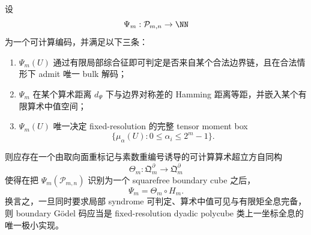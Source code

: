 \begin{conjecture}\label{conj:conclusion-boundary-godel-single-coordinate-holography-uniqueness}
设
\[
\Psi_m:\mathcal P_{m,n}\to \NN
\]
为一个可计算编码，并满足以下三条：
\begin{enumerate}
  \item \(\Psi_m(U)\) 通过有限局部综合征即可判定是否来自某个合法边界链，且在合法情形下 admit 唯一 bulk 解码；
  \item \(\Psi_m\) 在某个算术距离 \(d_{\Psi}\) 下与边界对称差的 Hamming 距离等距，并嵌入某个有限算术中值空间；
  \item \(\Psi_m(U)\) 唯一决定 fixed-resolution 的完整 tensor moment box
        \[
        \{\mu_\alpha(U):0\le \alpha_i\le 2^m-1\}.
        \]
\end{enumerate}
则应存在一个由取向面重标记与素数重编号诱导的可计算算术超立方自同构
\[
\Theta_m:\mathfrak Q_m^\partial\to \mathfrak Q_m^\partial
\]
使得在把 \(\Psi_m(\mathcal P_{m,n})\) 识别为一个 squarefree boundary cube 之后，
\[
\Psi_m=\Theta_m\circ H_m.
\]
换言之，一旦同时要求局部 syndrome 可判定、算术中值可见与有限矩全息完备，则 boundary Gödel 码应当是 fixed-resolution dyadic polycube 类上一坐标全息的唯一极小实现。
\end{conjecture}



\endinput
